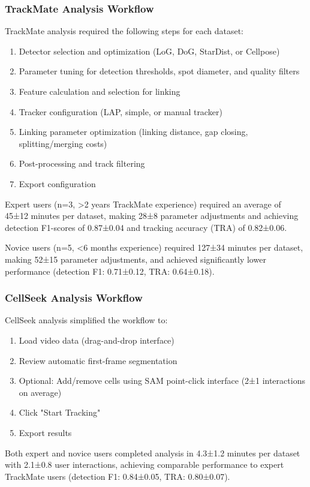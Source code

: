 \documentclass[12pt]{article}
\begin{document}
\subsubsection{TrackMate Analysis Workflow}

TrackMate analysis required the following steps for each dataset:
\begin{enumerate}
  \item Detector selection and optimization (LoG, DoG, StarDist, or Cellpose)
  \item Parameter tuning for detection thresholds, spot diameter, and quality filters
  \item Feature calculation and selection for linking
  \item Tracker configuration (LAP, simple, or manual tracker)
  \item Linking parameter optimization (linking distance, gap closing, splitting/merging costs)
  \item Post-processing and track filtering
  \item Export configuration
\end{enumerate}

Expert users (n=3, >2 years TrackMate experience) required an average of 45±12 minutes per dataset, making 28±8 parameter adjustments and achieving detection F1-scores of 0.87±0.04 and tracking accuracy (TRA) of 0.82±0.06.

Novice users (n=5, <6 months experience) required 127±34 minutes per dataset, making 52±15 parameter adjustments, and achieved significantly lower performance (detection F1: 0.71±0.12, TRA: 0.64±0.18).

\subsubsection{CellSeek Analysis Workflow}

CellSeek analysis simplified the workflow to:
\begin{enumerate}
  \item Load video data (drag-and-drop interface)
  \item Review automatic first-frame segmentation
  \item Optional: Add/remove cells using SAM point-click interface (2±1 interactions on average)
  \item Click "Start Tracking"
  \item Export results
\end{enumerate}

Both expert and novice users completed analysis in 4.3±1.2 minutes per dataset with 2.1±0.8 user interactions, achieving comparable performance to expert TrackMate users (detection F1: 0.84±0.05, TRA: 0.80±0.07).
\end{document}
